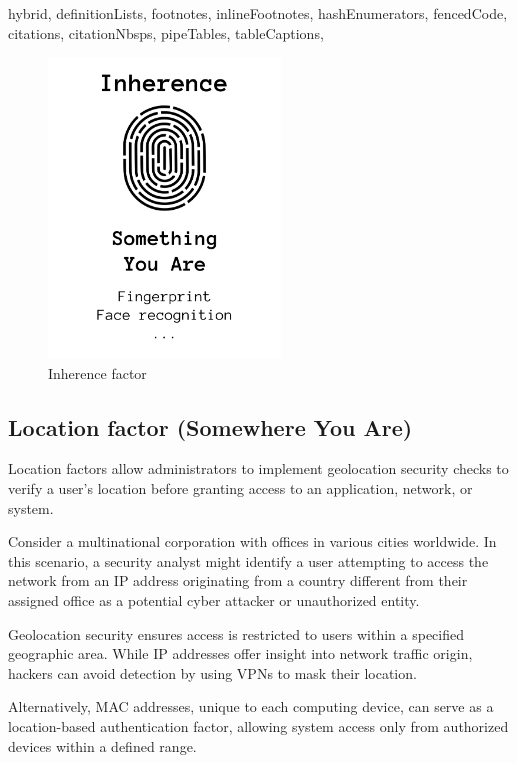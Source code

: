 \documentclass[
  digital,     %
  oneside,     %
  nosansbold,  %
  nocolorbold, %
  lof,         %
  lot,         %
]{fithesis4}
\begin{document}
\begin{markdown*}{%
  hybrid,
  definitionLists,
  footnotes,
  inlineFootnotes,
  hashEnumerators,
  fencedCode,
  citations,
  citationNbsps,
  pipeTables,
  tableCaptions,
}
\begin{figure}[htbp]
  \centering
  \includegraphics[width=0.55\textwidth]{img/inherence-final.png}
  \caption{Inherence factor}
  \label{fig:inherence-factor}
\end{figure}

\newpage
\subsection{Location factor (Somewhere You Are)}
Location factors allow administrators to implement geolocation security checks to verify a user's location before granting access to an application, network, or system.

Consider a multinational corporation with offices in various cities worldwide.
In this scenario, a security analyst might identify a user attempting to access the network from an IP address originating from a country different from their assigned office as a potential cyber attacker or unauthorized entity.

Geolocation security ensures access is restricted to users within a specified geographic area.
While IP addresses offer insight into network traffic origin, hackers can avoid detection by using VPNs to mask their location.

Alternatively, MAC addresses, unique to each computing device, can serve as a location-based authentication factor, allowing system access only from authorized devices within a defined range.


\end{markdown*}
\end{document}
